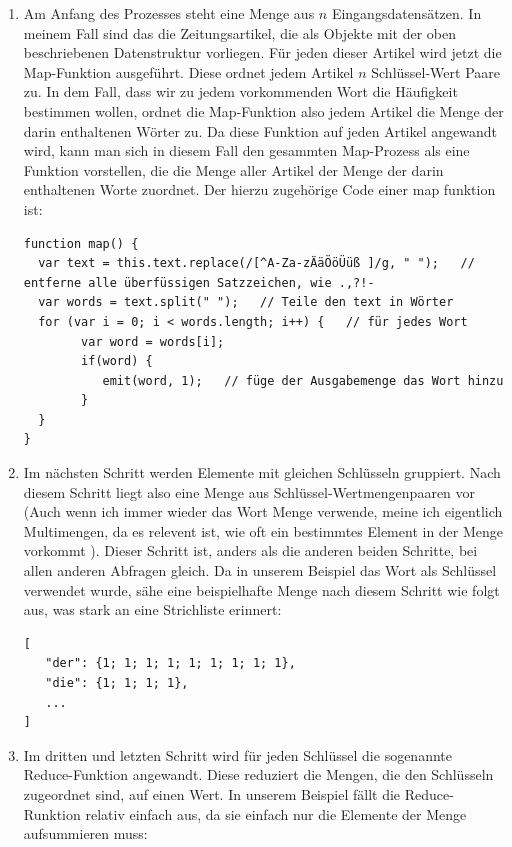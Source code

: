 \documentclass[12pt,ngerman,a4paperpaper,]{paper}
\renewcommand{\autocite}{\cite}
\begin{document}
\begin{enumerate}
\def\labelenumi{\arabic{enumi}.}
\item
  Am Anfang des Prozesses steht eine Menge aus \(n\)
  Eingangsdatensätzen. In meinem Fall sind das die Zeitungsartikel, die
  als Objekte mit der oben beschriebenen Datenstruktur vorliegen. Für
  jeden dieser Artikel wird jetzt die Map-Funktion ausgeführt. Diese
  ordnet jedem Artikel \(n\) Schlüssel-Wert Paare zu. In dem Fall, dass
  wir zu jedem vorkommenden Wort die Häufigkeit bestimmen wollen, ordnet
  die Map-Funktion also jedem Artikel die Menge der darin enthaltenen
  Wörter zu. Da diese Funktion auf jeden Artikel angewandt wird, kann
  man sich in diesem Fall den gesammten Map-Prozess als eine Funktion
  vorstellen, die die Menge aller Artikel der Menge der darin
  enthaltenen Worte zuordnet. Der hierzu zugehörige Code einer map
  funktion ist:

\begin{lstlisting}
function map() {
  var text = this.text.replace(/[^A-Za-zÄäÖöÜüß ]/g, " ");   // entferne alle überfüssigen Satzzeichen, wie .,?!-
  var words = text.split(" ");   // Teile den text in Wörter
  for (var i = 0; i < words.length; i++) {   // für jedes Wort
        var word = words[i];
        if(word) {
           emit(word, 1);   // füge der Ausgabemenge das Wort hinzu
        }
  }
}
\end{lstlisting}

\item
  Im nächsten Schritt werden Elemente mit gleichen Schlüsseln gruppiert.
  Nach diesem Schritt liegt also eine Menge aus
  Schlüssel-Wertmengenpaaren vor (Auch wenn ich immer wieder das Wort
  Menge verwende, meine ich eigentlich Multimengen, da es relevent ist,
  wie oft ein bestimmtes Element in der Menge vorkommt
  \autocite{multimenge}). Dieser Schritt ist, anders als die anderen
  beiden Schritte, bei allen anderen Abfragen gleich. Da in unserem
  Beispiel das Wort als Schlüssel verwendet wurde, sähe eine
  beispielhafte Menge nach diesem Schritt wie folgt aus, was stark an
  eine Strichliste erinnert:

\begin{lstlisting}
[
   "der": {1; 1; 1; 1; 1; 1; 1; 1; 1},
   "die": {1; 1; 1; 1},
   ...
]
\end{lstlisting}
\item
  Im dritten und letzten Schritt wird für jeden Schlüssel die sogenannte
  Reduce-Funktion angewandt. Diese reduziert die Mengen, die den
  Schlüsseln zugeordnet sind, auf einen Wert. In unserem Beispiel fällt
  die Reduce-Runktion relativ einfach aus, da sie einfach nur die
  Elemente der Menge aufsummieren muss:


\end{enumerate}
\end{document}
